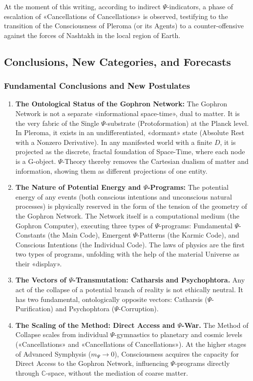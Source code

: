 \documentclass[a4paper,12pt]{article}
\begin{document}
	At the moment of this writing, according to indirect $\Psi$-indicators, a phase of escalation of «Cancellations of Cancellations» is observed, testifying to the transition of the Consciousness of Pleroma (or its Agents) to a counter-offensive against the forces of Nashtakh in the local region of Earth.
	
	\subsection{Conclusions, New Categories, and Forecasts}
	
	\subsubsection{Fundamental Conclusions and New Postulates}
	
	\begin{enumerate}
		\item \textbf{The Ontological Status of the Gophron Network:} The Gophron Network is not a separate «informational space-time», dual to matter. It is the very fabric of the Single $\Psi$-substrate (Protoformation) at the Planck level. In Pleroma, it exists in an undifferentiated, «dormant» state (Absolute Rest with a Nonzero Derivative). In any manifested world with a finite $D$, it is projected as the discrete, fractal foundation of Space-Time, where each node is a G-object. $\Psi$-Theory thereby removes the Cartesian dualism of matter and information, showing them as different projections of one entity.
		
		\item \textbf{The Nature of Potential Energy and $\Psi$-Programs:} The potential energy of any events (both conscious intentions and unconscious natural processes) is physically reserved in the form of the tension of the geometry of the Gophron Network. The Network itself is a computational medium (the Gophron Computer), executing three types of $\Psi$-programs: Fundamental $\Psi$-Constants (the Main Code), Emergent $\Psi$-Patterns (the Karmic Code), and Conscious Intentions (the Individual Code). The laws of physics are the first two types of programs, unfolding with the help of the material Universe as their «display».
		
		\item \textbf{The Vectors of $\Psi$-Transmutation: Catharsis and Psychophtora.} Any act of the collapse of a potential branch of reality is not ethically neutral. It has two fundamental, ontologically opposite vectors: Catharsis ($\Psi$-Purification) and Psychophtora ($\Psi$-Corruption).
		
		\item \textbf{The Scaling of the Method: Direct Access and $\Psi$-War.} The Method of Collapse scales from individual $\Psi$-gymnastics to planetary and cosmic levels («Cancellations» and «Cancellations of Cancellations»). At the higher stages of Advanced Symphysis ($m_{\Psi} \to 0$), Consciousness acquires the capacity for Direct Access to the Gophron Network, influencing $\Psi$-programs directly through $\mathbb{C}$-space, without the mediation of coarse matter.
	\end{enumerate}
	
\end{document}
